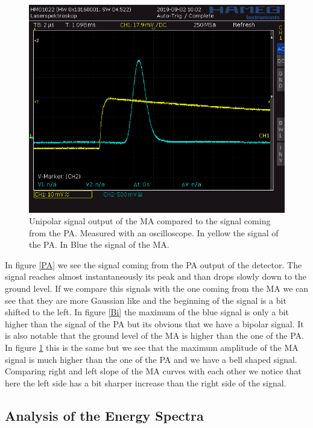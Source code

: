 \documentclass[30pt,a4paper]{article}
\begin{document}
 	\begin{figure}
 		\includegraphics[scale=0.42]{Bilder/OsziUnipolar}
 		\centering
 		\caption[Unipolar]{Unipolar signal output of the MA compared to the signal coming from the PA. Measured with an oscilloscope. In yellow the signal of the PA. In Blue the signal of the MA.}
 		\label{Uni}
 	\end{figure}
 	In figure \ref{PA} we see the signal coming from the PA output of the detector. The signal reaches almost instantaneously its peak and than drops slowly down to the ground level. If we compare this signals with the one coming from the MA we can see that they are more Gaussian like and the beginning of the signal is a bit shifted to the left. In figure \ref{Bi} the maximum of the blue signal is only a bit higher than the signal of the PA but its obvious that we have a bipolar signal. It is also notable that the ground level of the MA is higher than the one of the PA. In figure \ref{Uni} this is the same but we see that the maximum amplitude of the MA signal is much higher than the one of the PA and we have a bell shaped signal. Comparing right and left slope of the MA curves with each other we notice that here the left side has a bit sharper increase than the right side of the signal.
 	\subsection{Analysis of the Energy Spectra}
\end{document}
